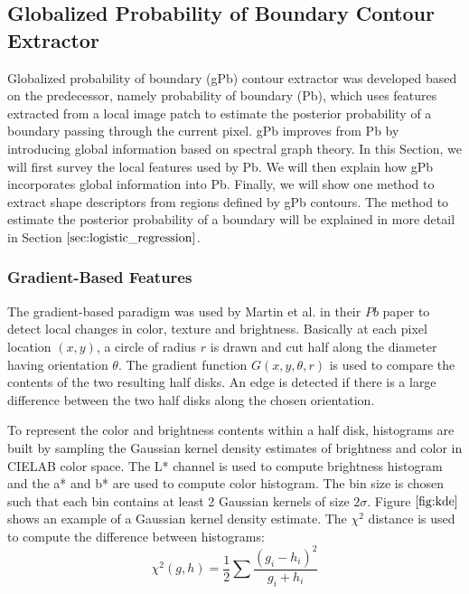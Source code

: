 \documentclass{SMBV12}
\begin{document}
\subsection{Globalized Probability of Boundary Contour Extractor}
\label{sec:shape_feature}

Globalized probability of boundary (gPb) contour extractor was developed based on the predecessor, namely probability of boundary (Pb), which uses features extracted from a local image patch to estimate the posterior probability of a boundary passing through the current pixel. gPb improves from Pb by introducing global information based on spectral graph theory. In this Section, we will first survey the local features used by Pb. We will then explain how gPb incorporates global information into Pb. Finally, we will show one method to extract shape descriptors from regions defined by gPb contours. The method to estimate the posterior probability of a boundary will be explained in more detail in Section $\ref{sec:logistic_regression}$.

\subsubsection{Gradient-Based Features}
\label{sec:textons}

The gradient-based paradigm was used by Martin et al. in their $Pb$ paper \cite{martin2004learning} to detect local changes in color, texture and brightness. Basically at each pixel location $(x, y)$, a circle of radius $r$ is drawn and cut half along the diameter having orientation $\theta$. The gradient function $G(x, y, \theta, r)$ is used to compare the contents of the two resulting half disks. An edge is detected if there is a large difference between the two half disks along the chosen orientation.

To represent the color and brightness contents within a half disk, histograms are built by sampling the Gaussian kernel density estimates of brightness and color in CIELAB color space. The L* channel is used to compute brightness histogram and the a* and b* are used to compute color histogram. The bin size is chosen such that each bin contains at least 2 Gaussian kernels of size $2\sigma$. Figure $\ref{fig:kde}$ shows an example of a Gaussian kernel density estimate. The $\chi^2$ distance is used to compute the difference between histograms:
\begin{equation}
	\chi^2(g, h) = \frac{1}{2} \sum \dfrac{(g_i - h_i)^2}{g_i + h_i}
\end{equation}
\end{document}
